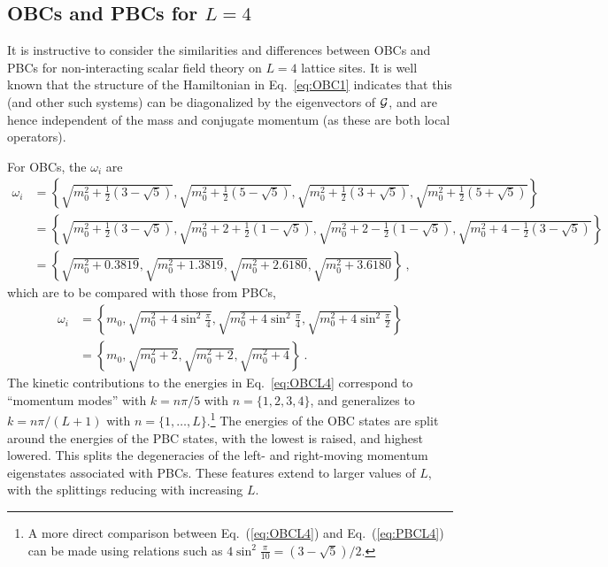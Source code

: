 \documentclass[aps, prc, tightenlines,superscriptaddress, letterpaper, amsmath, amssymb, preprintnumbers, floatfix, longbibliography, nofootinbib]{revtex4-2}
\begin{document}
\subsection{OBCs and PBCs for \texorpdfstring{$L=4$}{L=4}}
\label{app:OBCL4}
\noindent
It is instructive to consider the similarities and differences 
between OBCs and PBCs for non-interacting scalar field theory on $L=4$ lattice sites.
It is well known that the structure of the Hamiltonian in Eq.~\eqref{eq:OBC1} indicates that this (and other such systems) can be diagonalized by the eigenvectors of ${\cal G}$, and are hence independent of the mass and conjugate momentum (as these are both local operators).

For OBCs, the $\omega_i$ are
%
\begin{align}
\omega_i & =
\left\{ \sqrt{m_0^2 + \frac{1}{2}(3-\sqrt{5})} , 
\sqrt{m_0^2 + \frac{1}{2}(5-\sqrt{5})} ,
\sqrt{m_0^2 + \frac{1}{2}(3+\sqrt{5})} , 
\sqrt{m_0^2 + \frac{1}{2}(5+\sqrt{5})} \right\}
\nonumber\\
& = 
\left\{ \sqrt{m_0^2 + \frac{1}{2}(3-\sqrt{5})} , 
\sqrt{m_0^2 + 2 + \frac{1}{2}(1-\sqrt{5})} , 
\sqrt{m_0^2 + 2 - \frac{1}{2}(1-\sqrt{5})} , 
\sqrt{m_0^2 + 4 - \frac{1}{2}(3-\sqrt{5})} \right\}
\nonumber\\
& = 
\left\{ \sqrt{m_0^2 + 0.3819} , 
\sqrt{m_0^2 + 1.3819} , 
\sqrt{m_0^2 + 2.6180} , 
\sqrt{m_0^2 + 3.6180} \right\}
\ ,
\label{eq:OBCL4}
\end{align}
%
which are to be compared with those from PBCs,
%
\begin{align}
\omega_i & =
\left\{ m_0 , 
\sqrt{m_0^2 + 4\sin^2 \frac{\pi}{4}} ,
\sqrt{m_0^2 + 4\sin^2 \frac{\pi}{4}} , 
\sqrt{m_0^2 + 4\sin^2 \frac{\pi}{2}} \right\}
\nonumber\\
& =
\left\{ m_0 ,
\sqrt{m_0^2 + 2} , 
\sqrt{m_0^2 + 2} , 
\sqrt{m_0^2 + 4} \right\}
\ .
\label{eq:PBCL4}
\end{align}
%
The kinetic contributions to the energies in Eq.~\eqref{eq:OBCL4} correspond to ``momentum modes'' with $k=n \pi/5$ with $n=\{1,2,3,4\}$, and generalizes to $k=n \pi/(L+1)$ with $n=\{1,\ldots, L\}$.\footnote{A more direct comparison between  
Eq.~(\ref{eq:OBCL4}) and Eq.~(\ref{eq:PBCL4}) can be made using relations such as $4 \sin^2 \frac{\pi}{10} = (3-\sqrt{5})/2$.}
The energies of the OBC states are split around the energies of the PBC states, 
with the lowest is raised, and highest lowered.
This splits the degeneracies of the left- and right-moving momentum eigenstates associated with PBCs.
These features extend to larger values of $L$, with the splittings reducing with increasing $L$.
\end{document}
